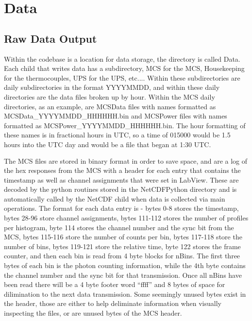 
\chapter{Data}
\label{CH-Data}

\section{Raw Data Output}
\label{Sec-DATAOutput}

Within the codebase is a location for data storage, the directory is called Data. Each child that writes data has a subdirectory, MCS for the MCS, Housekeeping for the thermocouples, UPS for the UPS, etc.... Within these subdirectories are daily subdirectories in the format YYYYMMDD, and within these daily directories are the data files broken up by hour. Within the MCS daily directories, as an example, are MCSData files with names formatted as MCSData\_YYYYMMDD\_HHHHHH.bin and MCSPower files with names formatted as MCSPower\_YYYYMMDD\_HHHHHH.bin. The hour formatting of these names is in fractional hours in UTC, so a time of 015000 would be 1.5 hours into the UTC day and would be a file that began at 1:30 UTC. 

The MCS files are stored in binary format in order to save space, and are a log of the hex responses from the MCS with a header for each entry that contains the timestamp as well as channel assignments that were set in LabView. These are decoded by the python routines stored in the NetCDFPython directory and is automatically called by the NetCDF child when data is collected via main operations. The format for each data entry is - bytes 0-8 stores the timestamp, bytes 28-96 store channel assignments, bytes 111-112 stores the number of profiles per histogram, byte 114 stores the channel number and the sync bit from the MCS, bytes 115-116 store the number of counts per bin, bytes 117-118 store the number of bins, bytes 119-121 store the relative time, byte 122 stores the frame counter, and then each bin is read from 4 byte blocks for nBins. The first three bytes of each bin is the photon counting information, while the 4th byte contains the channel number and the sync bit for that transmission. Once all nBins have been read there will be a 4 byte footer word ``ffff'' and 8 bytes of space for dilimination to the next data transmission. Some seemingly unused bytes exist in the header, those are either to help deliminate information when visually inspecting the files, or are unused bytes of the MCS header. 

